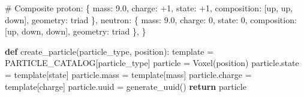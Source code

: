 \documentclass[
  11pt,
  letterpaper,
  twoside,
  openany]{book}
\newenvironment{Shaded}{\begin{snugshade}}{\end{snugshade}}
\newcommand{\CommentTok}[1]{\textcolor[rgb]{0.37,0.37,0.37}{#1}}
\newcommand{\ControlFlowTok}[1]{\textcolor[rgb]{0.00,0.23,0.31}{\textbf{#1}}}
\newcommand{\DecValTok}[1]{\textcolor[rgb]{0.68,0.00,0.00}{#1}}
\newcommand{\FloatTok}[1]{\textcolor[rgb]{0.68,0.00,0.00}{#1}}
\newcommand{\KeywordTok}[1]{\textcolor[rgb]{0.00,0.23,0.31}{\textbf{#1}}}
\newcommand{\NormalTok}[1]{\textcolor[rgb]{0.00,0.23,0.31}{#1}}
\newcommand{\OperatorTok}[1]{\textcolor[rgb]{0.37,0.37,0.37}{#1}}
\newcommand{\StringTok}[1]{\textcolor[rgb]{0.13,0.47,0.30}{#1}}
\begin{document}
\begin{Shaded}
\begin{Highlighting}[]
    \CommentTok{\# Composite}
    \StringTok{\textquotesingle{}proton\textquotesingle{}}\NormalTok{: \{}
        \StringTok{\textquotesingle{}mass\textquotesingle{}}\NormalTok{: }\FloatTok{9.0}\NormalTok{,}
        \StringTok{\textquotesingle{}charge\textquotesingle{}}\NormalTok{: }\OperatorTok{+}\DecValTok{1}\NormalTok{,}
        \StringTok{\textquotesingle{}state\textquotesingle{}}\NormalTok{: }\OperatorTok{+}\DecValTok{1}\NormalTok{,}
        \StringTok{\textquotesingle{}composition\textquotesingle{}}\NormalTok{: [}\StringTok{\textquotesingle{}up\textquotesingle{}}\NormalTok{, }\StringTok{\textquotesingle{}up\textquotesingle{}}\NormalTok{, }\StringTok{\textquotesingle{}down\textquotesingle{}}\NormalTok{],}
        \StringTok{\textquotesingle{}geometry\textquotesingle{}}\NormalTok{: }\StringTok{\textquotesingle{}triad\textquotesingle{}}
\NormalTok{    \},}
    \StringTok{\textquotesingle{}neutron\textquotesingle{}}\NormalTok{: \{}
        \StringTok{\textquotesingle{}mass\textquotesingle{}}\NormalTok{: }\FloatTok{9.0}\NormalTok{,}
        \StringTok{\textquotesingle{}charge\textquotesingle{}}\NormalTok{: }\DecValTok{0}\NormalTok{,}
        \StringTok{\textquotesingle{}state\textquotesingle{}}\NormalTok{: }\DecValTok{0}\NormalTok{,}
        \StringTok{\textquotesingle{}composition\textquotesingle{}}\NormalTok{: [}\StringTok{\textquotesingle{}up\textquotesingle{}}\NormalTok{, }\StringTok{\textquotesingle{}down\textquotesingle{}}\NormalTok{, }\StringTok{\textquotesingle{}down\textquotesingle{}}\NormalTok{],}
        \StringTok{\textquotesingle{}geometry\textquotesingle{}}\NormalTok{: }\StringTok{\textquotesingle{}triad\textquotesingle{}}
\NormalTok{    \},}
\NormalTok{\}}

\KeywordTok{def}\NormalTok{ create\_particle(particle\_type, position):}
\NormalTok{    template }\OperatorTok{=}\NormalTok{ PARTICLE\_CATALOG[particle\_type]}
\NormalTok{    particle }\OperatorTok{=}\NormalTok{ Voxel(position)}
\NormalTok{    particle.state }\OperatorTok{=}\NormalTok{ template[}\StringTok{\textquotesingle{}state\textquotesingle{}}\NormalTok{]}
\NormalTok{    particle.mass }\OperatorTok{=}\NormalTok{ template[}\StringTok{\textquotesingle{}mass\textquotesingle{}}\NormalTok{]}
\NormalTok{    particle.charge }\OperatorTok{=}\NormalTok{ template[}\StringTok{\textquotesingle{}charge\textquotesingle{}}\NormalTok{]}
\NormalTok{    particle.uuid }\OperatorTok{=}\NormalTok{ generate\_uuid()}
    \ControlFlowTok{return}\NormalTok{ particle}
\end{Highlighting}
\end{Shaded}
\end{document}
